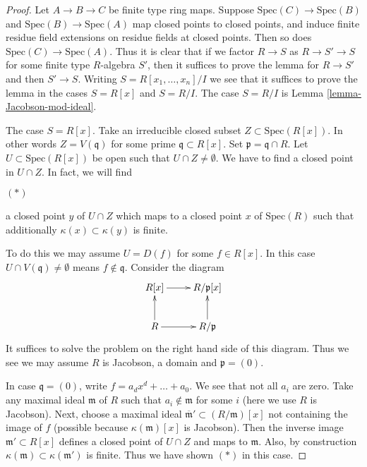 \begin{proof}
Let $A \to B \to C$ be finite type ring maps.
Suppose $\text{Spec}(C) \to \text{Spec}(B)$ and
$\text{Spec}(B) \to \text{Spec}(A)$ map closed 
points to closed points, and induce finite residue
field extensions on residue fields at closed points.
Then so does $\text{Spec}(C) \to \text{Spec}(A)$.
Thus it is clear that if we factor $R \to S$ as
$R \to S' \to S$ for some finite type $R$-algebra
$S'$, then it suffices to prove the lemma
for $R\to S'$ and then $S' \to S$.
Writing $S = R[x_1,\ldots,x_n]/I$ we see that
it suffices to prove the lemma in the cases
$S = R[x]$ and $S = R/I$. The case $S = R/I$
is Lemma \ref{lemma-Jacobson-mod-ideal}.

\medskip\noindent
The case  $S = R[x]$.
Take an irreducible closed subset
$Z \subset \text{Spec}(R[x])$.
In other words $Z = V(\mathfrak q)$ for some
prime $\mathfrak q \subset R[x]$. Set
$\mathfrak p = \mathfrak q \cap R$. 
Let $U \subset \text{Spec}(R[x])$ be open
such that $U \cap Z \not = \emptyset$.
We have to find a closed point in $U \cap Z$.
In fact, we will find
\begin{list}{$(*)$}{}
\item
a closed point $y$ of $U \cap Z$
which maps to a closed point $x$ of $\text{Spec}(R)$
such that additionally $\kappa(x) \subset \kappa(y)$
is finite.
\end{list}
To do this we may assume $U = D(f)$ for some $f \in R[x]$.
In this case $U\cap V(\mathfrak q) \not = \emptyset$
means $f \not \in \mathfrak q$. Consider the diagram
$$
\xymatrix{
R[x] \ar[r] & R/\mathfrak p[x]  \\
R \ar[r] \ar[u] & R/\mathfrak p  \ar[u]
}
$$
It suffices to solve the problem on the right hand side
of this diagram. Thus
we see we may assume $R$ is Jacobson, a domain and
$\mathfrak p = (0)$.

\medskip\noindent
In case $\mathfrak q = (0)$, write $f = a_d x^d + \ldots + a_0$.
We see that not all $a_i$ are zero. Take any maximal ideal
$\mathfrak m$ of $R$ such that $a_i \not \in \mathfrak m$
for some $i$ (here we use $R$ is Jacobson). Next, choose
a maximal ideal $\overline{\mathfrak m}' \subset (R/\mathfrak m)[x]$
not containing the image of $f$ (possible because
$\kappa(\mathfrak m)[x]$ is Jacobson). Then the inverse image
$\mathfrak m' \subset R[x]$ defines a closed point of
$U \cap Z$ and maps to $\mathfrak m$. Also, by construction
$\kappa(\mathfrak m) \subset \kappa(\mathfrak m')$ is finite.
Thus we have shown $(*)$ in this case.


\end{proof}
